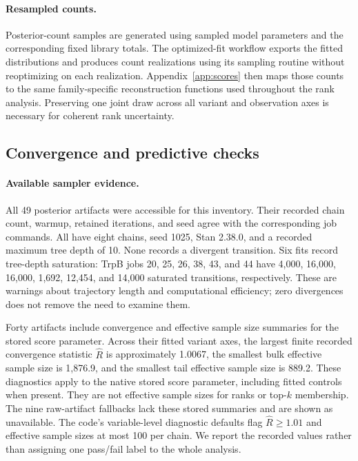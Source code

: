 \paragraph{Resampled counts.}
Posterior-count samples are generated using sampled model parameters and
the corresponding fixed library totals. The optimized-fit workflow exports
the fitted distributions and produces count realizations using its sampling
routine without reoptimizing on each realization. Appendix~\ref{app:scores}
then maps those counts to the same family-specific reconstruction functions
used throughout the rank analysis. Preserving one joint draw across all
variant and observation axes is necessary for coherent rank uncertainty.

\subsection{Convergence and predictive checks}
\label{app:fit-checks}

\paragraph{Available sampler evidence.}
All 49 posterior artifacts were accessible for this inventory. Their recorded
chain count, warmup, retained iterations, and seed agree with the corresponding
job commands. All have eight chains, seed 1025, Stan 2.38.0, and a recorded
maximum tree depth of 10. None records a divergent transition. Six fits record
tree-depth saturation: TrpB jobs 20, 25, 26, 38, 43, and 44 have 4,000,
16,000, 16,000, 1,692, 12,454, and 14,000 saturated transitions, respectively.
These are warnings about trajectory length and computational efficiency;
zero divergences does not remove the need to examine them.

Forty artifacts include convergence and effective sample size summaries for
the stored score parameter. Across their fitted variant axes, the largest
finite recorded convergence statistic $\hat R$ is approximately 1.0067,
the smallest bulk effective sample size is 1,876.9,
and the smallest tail effective sample size is 889.2. These diagnostics apply
to the native stored score parameter, including fitted controls when present.
They are not effective sample sizes for ranks or top-$k$ membership. The nine
raw-artifact fallbacks lack these stored summaries and are shown as unavailable.
The code's variable-level diagnostic
defaults flag $\hat R\geq1.01$ and effective sample sizes at most 100 per
chain. We report the recorded values rather than assigning one pass/fail
label to the whole analysis.

